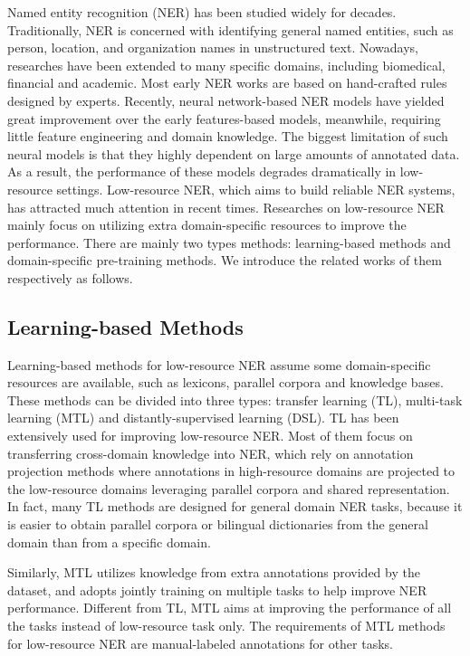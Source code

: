 \documentclass[10pt, conference, compsocconf]{IEEEtran}
\begin{document}
Named entity recognition (NER) has been studied widely for decades. 
Traditionally, NER is concerned with identifying general named entities, such as person, location, and organization names 
in unstructured text. Nowadays, researches have been extended to many specific domains, including biomedical, financial
and academic. Most early NER works are based on hand-crafted rules designed by experts\cite{collobert2011natural,yang2012extracting,luo2015joint}. 
Recently, neural network-based NER models\cite{ma-hovy-2016-end,lample-etal-2016-neural,liu2018empower} have yielded great improvement over the early features-based models, 
meanwhile, requiring little feature engineering and domain knowledge\cite{yang2012extracting,ma-hovy-2016-end}. 
The biggest limitation of such neural models is that they
highly dependent on large amounts of annotated data. As a result, 
the performance of these models degrades dramatically in low-resource settings.
Low-resource NER, which aims to build reliable NER systems, has attracted much attention in recent times.
Researches on low-resource NER
mainly focus on utilizing extra domain-specific resources to improve the performance.
There are mainly two types methods: learning-based methods and domain-specific pre-training methods. 
We introduce the related works of them respectively as follows.

\subsection{Learning-based Methods} 
Learning-based methods for low-resource NER assume some domain-specific resources are available, such as
lexicons, parallel corpora and knowledge bases. 
These methods can be divided into three types: transfer learning (TL), multi-task learning (MTL)
and distantly-supervised learning (DSL).
TL has been extensively used for improving low-resource NER\cite{li2012joint, yang2017transfer}.
Most of them focus on transferring cross-domain knowledge into NER, which
rely on annotation projection methods where annotations in high-resource domains
are projected to the low-resource domains leveraging parallel corpora\cite{chen2010jointly, ni-etal-2017-weakly} and shared representation\cite{zhou-etal-2019-dual,chaudhary-etal-2019-little,cao-etal-2019-low}. 
In fact, many TL methods are designed for general domain NER tasks, 
because it is easier to obtain parallel corpora or bilingual dictionaries from the general domain than 
from a specific domain.


Similarly, MTL utilizes knowledge from extra annotations provided by the dataset, and
adopts jointly training on multiple tasks to help improve NER performance\cite{luan-etal-2018-multi,eberts2019span,wadden-etal-2019-entity}. 
Different from TL, MTL aims at improving the performance of all the tasks instead of low-resource task only. 
The requirements of MTL methods for low-resource NER are manual-labeled annotations for other tasks.
\end{document}
